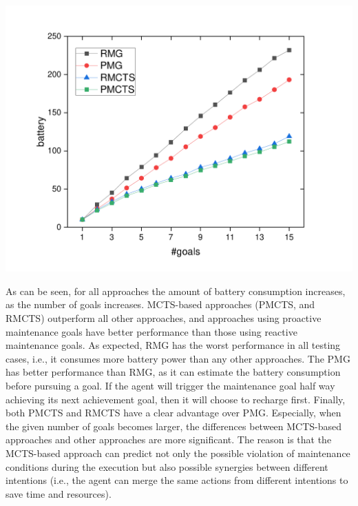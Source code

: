 \documentclass[portrait, plainsections]{sciposter}
\begin{document}
\begin{multicols}{3}
\begin{center}\vspace{1cm}
\includegraphics[scale=1]{./figs/gX_cY_fixCap40.pdf}
\label{fig:static1}
\end{center}\vspace{1cm}

As can be seen, for all approaches the amount of battery consumption increases, as the number of goals increases.
MCTS-based approaches (PMCTS, and RMCTS) outperform all other approaches, and approaches using proactive maintenance goals have better performance than those using reactive maintenance goals.
As expected, RMG has the worst performance in all testing cases, i.e., it consumes more battery power than any other approaches.
The PMG has better performance than RMG, as it can estimate the battery consumption before pursuing a goal. If the agent will trigger the maintenance goal half way achieving its next achievement goal, then it will choose to recharge first.
Finally, both PMCTS and RMCTS have a clear advantage over PMG. Especially, when the given number of goals becomes larger, the differences between MCTS-based approaches and other approaches are more significant. The reason is that the MCTS-based approach can predict not only the possible violation of maintenance conditions during the execution but also possible synergies between different intentions (i.e., the agent can merge the same actions from different intentions to save time and resources).


\end{multicols}
\end{document}
